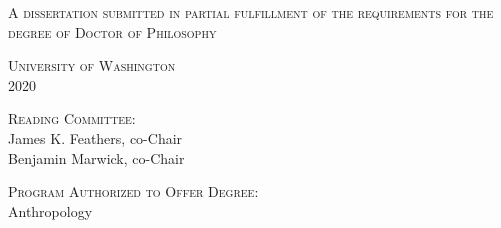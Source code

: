

\begin{titlingpage}
\begin{center}\leavevmode

    \normalfont
    \vfill

    {\Large \textsc{\thesisTitle}\par
    \hrulefill\par}
    
    \vfill
    
    {\Large \thesisAuthor\par}%

	\vfill
    
    {\large \textsc{A dissertation
submitted in partial fulfillment of the
requirements for the degree of Doctor of Philosophy\\[0.5em]}}
    
\vfill

    
    {\large \textsc{University of Washington\\ 2020}}

	\vfill
	
	{\large \textsc{Reading Committee:}\\
	James K. Feathers, co-Chair\\
	Benjamin Marwick, co-Chair\\ }
	
	\vfill
	
	{\large \textsc{Program Authorized to Offer Degree:}\\
	Anthropology\\}
	
	

\end{center}%
\end{titlingpage}
